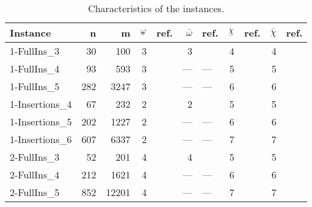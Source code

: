 \begin{table}[t]
\centering
\caption{Characteristics of the instances.} 
\label{tab:instances}
\begingroup\footnotesize
\begin{tabular}{lrrrlrlrlrl}
  \toprule
  Instance & n & m & $\ubar{\omega}$ & ref. & $\bar{\omega}$ & ref. & $\ubar{\chi}$ & ref. & $\bar{\chi}$ & ref. \\ \midrule
1-FullIns\_3 & 30 & 100 & 3 & \cite{Gualandi2012} & 3 & \cite{Gualandi2012} & 4 & \cite{Gualandi2012} & 4 & \cite{Gualandi2012} \\ 
  1-FullIns\_4 & 93 & 593 & 3 & \cite{Malaguti2011} & --- & --- & 5 & \cite{Mendez-Diaz2006} & 5 & \cite{Mendez-Diaz2006,Malaguti2011,Gualandi2012,Brelaz1979,Sewell1996,Segundo2012} \\ 
  1-FullIns\_5 & 282 & 3247 & 3 & \cite{Malaguti2011} & --- & --- & 6 & \cite{Malaguti2010} & 6 & \cite{Malaguti2010,Mendez-Diaz2006,Mendez-Diaz2006,Malaguti2011,Gualandi2012,Brelaz1979,Sewell1996,Segundo2012} \\ 
  1-Insertions\_4 & 67 & 232 & 2 & \cite{Malaguti2011,Gualandi2012} & 2 & \cite{Gualandi2012} & 5 & \cite{Mendez-Diaz2006,Malaguti2011,Gualandi2012} & 5 & \cite{Mendez-Diaz2006,Malaguti2011,Gualandi2012,Brelaz1979,Sewell1996,Segundo2012} \\ 
  1-Insertions\_5 & 202 & 1227 & 2 & \cite{Malaguti2011} & --- & --- & 6 & \cite{Malaguti2010} & 6 & \cite{Mendez-Diaz2006,Mendez-Diaz2006,Malaguti2011,Gualandi2012,Brelaz1979,Sewell1996,Segundo2012} \\ 
  1-Insertions\_6 & 607 & 6337 & 2 & \cite{Malaguti2011,Held2011} & --- & --- & 7 & \cite{Malaguti2010} & 7 & \cite{Mendez-Diaz2006,Mendez-Diaz2006,Malaguti2011,Gualandi2012} \\ 
  2-FullIns\_3 & 52 & 201 & 4 & \cite{Malaguti2011,Gualandi2012} & 4 & \cite{Gualandi2012} & 5 & \cite{Mendez-Diaz2006,Mendez-Diaz2006,Malaguti2011,Gualandi2012} & 5 & \cite{Mendez-Diaz2006,Mendez-Diaz2006,Malaguti2011,Gualandi2012,Brelaz1979,Sewell1996,Segundo2012} \\ 
  2-FullIns\_4 & 212 & 1621 & 4 & \cite{us} & --- & --- & 6 & \cite{Malaguti2010} & 6 & \cite{Malaguti2010,Mendez-Diaz2006,Mendez-Diaz2006,Malaguti2011,Gualandi2012,Brelaz1979,Sewell1996,Segundo2012} \\ 
  2-FullIns\_5 & 852 & 12201 & 4 & \cite{us} & --- & --- & 7 & \cite{Malaguti2010,Mendez-Diaz2006} & 7 & \cite{Malaguti2010,Mendez-Diaz2006,Gualandi2012,Brelaz1979,Sewell1996,Segundo2012} \\ 

\end{tabular}
\end{table}
